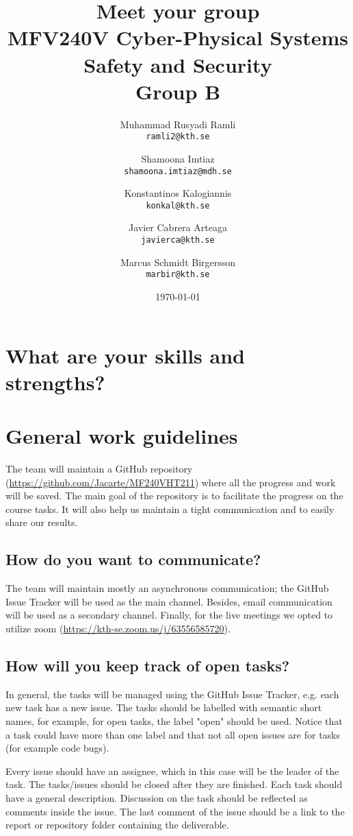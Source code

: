 \documentclass{article}
\title{Meet your group \\ \large MFV240V Cyber-Physical Systems Safety and Security \\ Group B}
\author{
  \and
  Muhammad Rusyadi Ramli\\
  \texttt{ramli2@kth.se}
  \and
  Shamoona Imtiaz\\
  \texttt{shamoona.imtiaz@mdh.se}
  \and
  Konstantinos Kalogiannis\\
  \texttt{konkal@kth.se}
  \and
  Javier Cabrera Arteaga\\
  \texttt{javierca@kth.se}
  \and
  Marcus Schmidt Birgersson\\
  \texttt{marbir@kth.se}
}
\date{\today}
\begin{document}
\maketitle

\section{What are your skills and strengths?}


\section{General work guidelines}

The team will maintain a GitHub repository (\url{https://github.com/Jacarte/MF240VHT211}) where all the progress and work will be saved. The main goal of the repository is to facilitate the progress on the course tasks. It will also help us maintain a tight communication and to easily share our results. 

\subsection{How do you want to communicate?}

The team will maintain mostly an asynchronous communication; the GitHub Issue Tracker will be used as the main channel. Besides, email communication will be used as a secondary channel. Finally, for the live meetings we opted to utilize zoom (\url{https://kth-se.zoom.us/j/63556585720}).

\subsection{How will you keep track of open tasks?}

In general, the tasks will be managed using the GitHub Issue Tracker, e.g. each new task has a new issue. The tasks should be labelled with semantic short names, for example, for open tasks, the label "open" should be used. Notice that a task could have more than one label and that not all open issues are for tasks (for example code bugs). 

Every issue should have an assignee, which in this case will be the leader of the task. The tasks/issues should be closed after they are finished. Each task should have a general description. Discussion on the task should be reflected as comments inside the issue. The last comment of the issue should be a link to the report or repository folder containing the deliverable.
\end{document}

